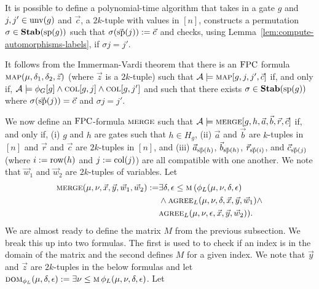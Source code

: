 \documentclass[../paper.tex]{subfiles}
\begin{document}
It is possible to define a polynomial-time algorithm that takes in a gate $g$
and $j, j' \in \text{unv}(g)$ and $\vec{c}$, a $2k$-tuple with values in $[n]$,
constructs a permutation $\sigma \in \text{\textbf{Stab}} (\text{sp} (g))$ such that $\sigma
(\vec{\text{sp}}(j)) := \vec{c}$ and checks, using
Lemma~\ref{lem:compute-automorphisms-labels}, if $\sigma j = j'$.

It follows from the Immerman-Vardi theorem that there is an $\text{\upshape FPC}$ formula
$\textsc{map}(\mu, \delta_1, \delta_2, \vec{z})$ (where $\vec{z}$ is a $2k$-tuple)
such that $\mathcal{A} \models \textsc{map}[g, j, j', \vec{c}]$ if, and only if,
$\mathcal{A} \models \phi_G [g] \land \textsc{col}[g, j] \land \textsc{col}[g, j']$ and
such that there exists $\sigma \in \text{\textbf{Stab}} (\text{sp} (g))$ where $\sigma (\vec{\text{sp}}(j)) =
\vec{c}$ and $\sigma j = j'$.
				
				
We now define an $\text{\upshape FPC}$-formula $\textsc{merge}$ such that $\mathcal{A} \models
\textsc{merge}[g, h, \vec{a}, \vec{b}, \vec{r}, \vec{c}]$ if, and only if, (i) $g$
and $h$ are gates such that $h \in H_g$, (ii) $\vec{a}$ and $\vec{b}$ are
$k$-tuples in $[n]$ and $\vec{r}$ and $\vec{c}$ are $2k$-tuples in $[n]$, and
(iii) $\vec{a}_{\vec{\text{sp}}(h)}$, $\vec{b}_{\vec{\text{sp}}(h)}$,
$\vec{r}_{\vec{\text{sp}}(i)}$, and $\vec{c}_{\vec{\text{sp}}(j)}$ (where $i := \text{row}
(h)$ and $j := \text{col} (j)$) are all compatible with one another. We note that
$\vec{w}_1$ and $\vec{w}_2$ are $2k$-tuples of variables. Let
\begin{align*}
	\textsc{merge} (\mu, \nu, \vec{x}, \vec{y}, \vec{w}_1, \vec{w}_2) := & \exists \delta, \epsilon \leq \textsc{m} \, ( \phi_L (\mu, \nu, \delta, \epsilon) \\ & \land \textsc{agree}_L (\mu, \nu , \delta, \vec{x}, \vec{y}, \vec{w}_1) \land \\ & \textsc{agree}_L (\mu, \nu , \epsilon, \vec{x}, \vec{y}, \vec{w}_2)).
\end{align*}
We are almost ready to define the matrix $M$ from the previous subsection. We
break this up into two formulas. The first is used to to check if an index is in
the domain of the matrix and the second defines $M$ for a given index. We note
that $\vec{y}$ and $\vec{z}$ are $2k$-tuples in the below formulas and let
$\textsc{dom}_{\phi_L} (\mu, \delta, \epsilon) := \exists \nu \leq \textsc{m} \, \phi_L
(\mu, \nu, \delta, \epsilon)$. Let
				
\end{document}
